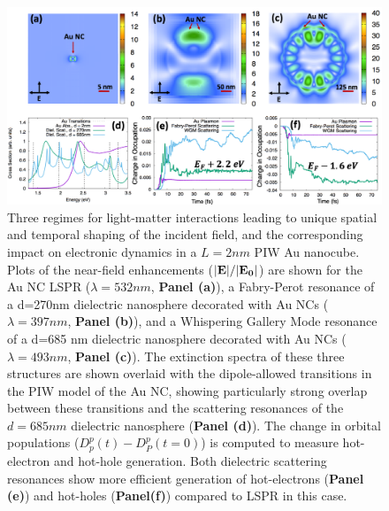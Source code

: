 \documentclass[journal=jpclcd,manuscript=article]{achemso}
\begin{document}
\begin{figure}
\begin{center}
\includegraphics[width=6in]{Au_AllThree_Alternate.png}
\caption{Three regimes for light-matter interactions leading to unique
spatial and temporal shaping of the incident field, and the corresponding
impact on electronic dynamics in a $L=2nm$ PIW Au nanocube. Plots of the near-field enhancements (${\bf |E|}/{\bf |E_0|}$) are shown for the
Au NC LSPR ($\lambda=532 nm$, {\bf Panel (a)}), a Fabry-Perot resonance of a d=270nm dielectric nanosphere decorated with Au NCs ($\lambda = 397 nm$, {\bf Panel (b)}),
and a Whispering Gallery Mode resonance of a d=685 nm dielectric nanosphere decorated with Au NCs ($\lambda = 493 nm$, {\bf Panel (c)}).
The extinction spectra of these three structures are shown overlaid with the dipole-allowed transitions in the PIW model of the Au NC, showing particularly
strong overlap between these transitions and the scattering resonances of the $d=685 nm$ dielectric nanosphere ({\bf Panel (d)}).
The change in orbital populations ($D_p^p(t)-D_P^p(t=0)$) is computed to measure hot-electron and hot-hole generation.
Both dielectric scattering resonances show more efficient generation of hot-electrons ({\bf Panel (e)}) and hot-holes ({\bf Panel(f)}) compared to LSPR in this case.}
\end{center}
\end{figure}
\end{document}
